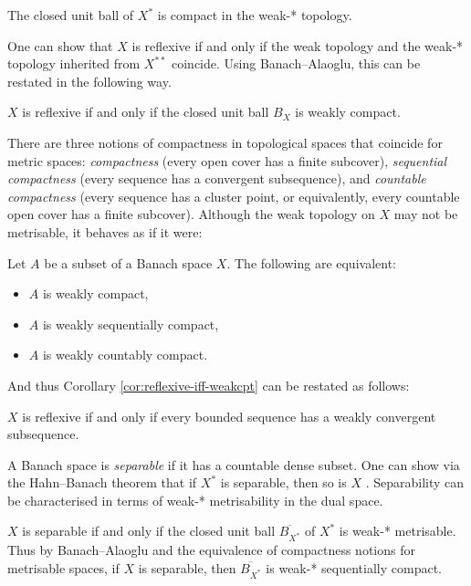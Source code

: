 \cite[Theorem IV.21]{RS80}
\begin{thm}
  The closed unit ball of $X^*$ is compact in the weak-* topology.
\end{thm}

One can show that $X$ is reflexive if and only if the weak topology and the weak-* topology inherited from $X^{**}$ coincide.
Using Banach--Alaoglu, this can be restated in the following way.

\begin{cor}\label{cor:reflexive-iff-weakcpt}
  $X$ is reflexive if and only if the closed unit ball $B_{X}$ is weakly compact.
\end{cor}


There are three notions of compactness in topological spaces that coincide for metric spaces: \emph{compactness} (every open cover has a finite subcover), \emph{sequential compactness} (every sequence has a convergent subsequence), and \emph{countable compactness} (every sequence has a cluster point, or equivalently, every countable open cover has a finite subcover).
Although the weak topology on $X$ may not be metrisable, it behaves as if it were:

\begin{thm}\label{thm:eberlein-smulian}
  Let $A$ be a subset of a Banach space $X$.
  The following are equivalent:
  \begin{itemize}
  \item $A$ is weakly compact,
  \item $A$ is weakly sequentially compact,
  \item $A$ is weakly countably compact.
  \end{itemize}
\end{thm}

And thus Corollary \ref{cor:reflexive-iff-weakcpt} can be restated as follows:

\begin{cor}\label{cor:reflexive-bdd-subsequence}
  $X$ is reflexive if and only if every bounded sequence has a weakly convergent subsequence.
\end{cor}

A Banach space is \emph{separable} if it has a countable dense subset.
One can show via the Hahn--Banach theorem that if $X^*$ is separable, then so is $X$ \cite[Theorem III.7]{RS80}.
Separability can be characterised in terms of weak-* metrisability in the dual space.

\begin{thm}\label{thm:sep-met-dual}
  $X$ is separable if and only if the closed unit ball $\overline{B_{X^*}}$ of $X^*$ is weak-* metrisable.
  Thus by Banach--Alaoglu and the equivalence of compactness notions for metrisable spaces, if $X$ is separable, then $\overline{B_{X^*}}$ is weak-* sequentially compact.
\end{thm}

